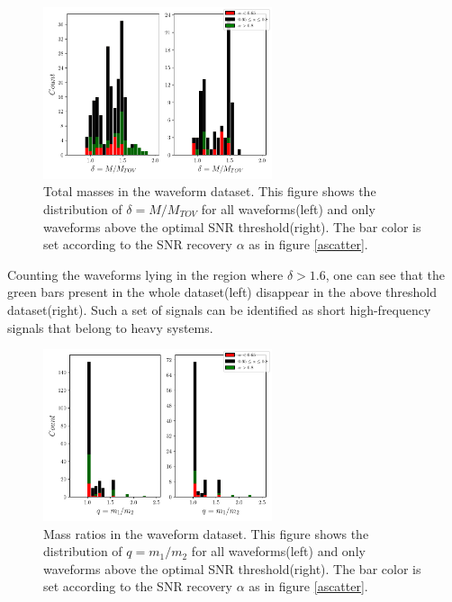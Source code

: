 \begin{figure}[hbt!]
\begin{center}
\includegraphics[width=0.6\textwidth, angle=0]{images/Data_analysis/results/alpha_deltahist.pdf}
\captionsetup{width=0.8\textwidth}
\caption[Total masses in the waveform dataset]{Total masses in the waveform dataset. This figure shows the distribution of $\delta=M/M_{TOV}$ for all waveforms(left) and only waveforms above the optimal SNR threshold(right). The bar color is set according to the SNR recovery $\alpha$ as in figure \ref{ascatter}.}
\label{adelhist}
\end{center}
\end{figure}

Counting the waveforms lying in the region where $\delta>1.6$, one can see that the green bars present in the whole dataset(left) disappear in the above threshold dataset(right). Such a set of signals can be identified as short high-frequency signals that belong to heavy systems. 

\begin{figure}[hbt!]
\begin{center}
\includegraphics[width=0.6\textwidth, angle=0]{images/Data_analysis/results/alpha_qhist.pdf}
\captionsetup{width=0.8\textwidth}
\caption[Mass ratios in the waveform dataset]{Mass ratios in the waveform dataset. This figure shows the distribution of $q=m_1/m_2$ for all waveforms(left) and only waveforms above the optimal SNR threshold(right). The bar color is set according to the SNR recovery $\alpha$ as in figure \ref{ascatter}.}
\label{aqhist}
\end{center}
\end{figure}

